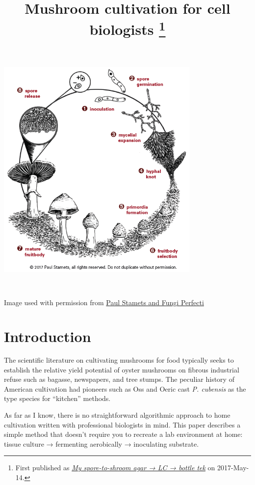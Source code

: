 \documentclass{article}
\title{Mushroom cultivation for cell biologists
	\footnote{First published as
	\href{https://www.shroomery.org/forums/showflat.php/Number/24317334}{\emph{My spore-to-shroom agar → LC → bottle tek}} on 2017-May-14.}}
\begin{document}
	\frenchspacing
	\linespread{1.6}
	\maketitle


\begin{center}
	\includegraphics[width=0.75\textwidth]{lifecycle}

	~

	Image used with permission from
	\href{https://hostdefense.com/blogs/host-defense-blog/the-mushroom-lifecycle}{Paul Stamets and Fungi Perfecti}
\end{center}
\newpage


\section*{Introduction}
The scientific literature on cultivating mushrooms for food typically seeks to establish the relative yield potential of oyster mushrooms on fibrous industrial refuse such as bagasse, newspapers, and tree stumps.
The peculiar history of American cultivation had pioneers such as Oss and Oeric cast \emph{P. cubensis} as the type species for ``kitchen'' methods.

As far as I know, there is no straightforward algorithmic approach to home cultivation written with professional biologists in mind.
This paper describes a simple method that doesn't require you to recreate a lab environment at home: tissue culture → fermenting aerobically →  inoculating substrate.
\end{document}
